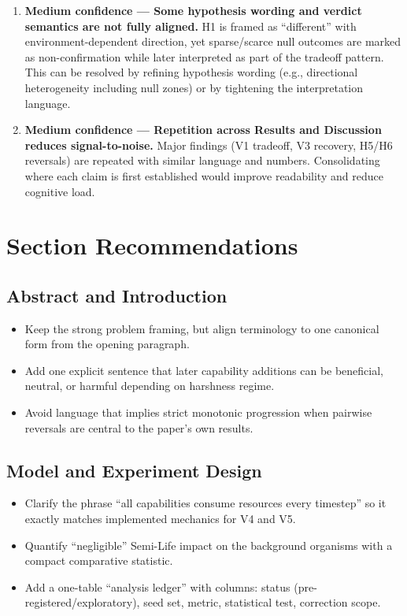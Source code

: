 \documentclass[11pt]{article}
\begin{document}
\begin{enumerate}[leftmargin=1.5em]
  \item \textbf{Medium confidence --- Some hypothesis wording and verdict semantics are not fully aligned.}
  H1 is framed as ``different'' with environment-dependent direction, yet sparse/scarce null outcomes are marked as non-confirmation while later interpreted as part of the tradeoff pattern. This can be resolved by refining hypothesis wording (e.g., directional heterogeneity including null zones) or by tightening the interpretation language.

  \item \textbf{Medium confidence --- Repetition across Results and Discussion reduces signal-to-noise.}
  Major findings (V1 tradeoff, V3 recovery, H5/H6 reversals) are repeated with similar language and numbers. Consolidating where each claim is first established would improve readability and reduce cognitive load.
\end{enumerate}

\section*{Section Recommendations}

\subsection*{Abstract and Introduction}
\begin{itemize}[leftmargin=1.5em]
  \item Keep the strong problem framing, but align terminology to one canonical form from the opening paragraph.
  \item Add one explicit sentence that later capability additions can be beneficial, neutral, or harmful depending on harshness regime.
  \item Avoid language that implies strict monotonic progression when pairwise reversals are central to the paper's own results.
\end{itemize}

\subsection*{Model and Experiment Design}
\begin{itemize}[leftmargin=1.5em]
  \item Clarify the phrase ``all capabilities consume resources every timestep'' so it exactly matches implemented mechanics for V4 and V5.
  \item Quantify ``negligible'' Semi-Life impact on the background organisms with a compact comparative statistic.
  \item Add a one-table ``analysis ledger'' with columns: status (pre-registered/exploratory), seed set, metric, statistical test, correction scope.
\end{itemize}
\end{document}
